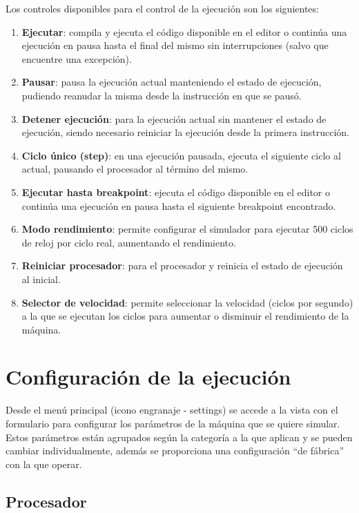 \documentclass[../main.tex]{subfiles}
\begin{document}
Los controles disponibles para el control de la ejecución son los siguientes:

\begin{enumerate}
	\item \textbf{Ejecutar}: compila y ejecuta el código disponible en el editor o continúa una ejecución en pausa hasta el final del mismo sin interrupciones (salvo que encuentre una excepción).
	\item \textbf{Pausar}: pausa la ejecución actual manteniendo el estado de ejecución, pudiendo reanudar la misma desde la instrucción en que se pausó.
	\item \textbf{Detener ejecución}: para la ejecución actual sin mantener el estado de ejecución, siendo necesario reiniciar la ejecución desde la primera instrucción.
	\item \textbf{Ciclo único (step)}: en una ejecución pausada, ejecuta el siguiente ciclo al actual, pausando el procesador al término del mismo.
	\item \textbf{Ejecutar hasta breakpoint}: ejecuta el código disponible en el editor o continúa una ejecución en pausa hasta el siguiente breakpoint encontrado.
	\item \textbf{Modo rendimiento}: permite configurar el simulador para ejecutar 500 ciclos de reloj por ciclo real, aumentando el rendimiento.
	\item \textbf{Reiniciar procesador}: para el procesador y reinicia el estado de ejecución al inicial.
	\item \textbf{Selector de velocidad}: permite seleccionar la velocidad (ciclos por segundo) a la que se ejecutan los ciclos para aumentar o disminuir el rendimiento de la máquina.
\end{enumerate}

\section{Configuración de la ejecución}

Desde el menú principal (icono engranaje - settings) se accede a la vista con el formulario para configurar los parámetros de la máquina que se quiere simular. Estos parámetros están agrupados según la categoría a la que aplican y se pueden cambiar individualmente, además se proporciona una configuración ``de fábrica'' con la que operar.

\subsection{Procesador}
\end{document}
